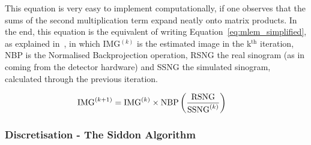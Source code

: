 This equation is very easy to implement computationally, if one observes
that the sums of the second multiplication term expand neatly onto
matrix products. In the end, this equation is the equivalent of writing
Equation~\ref{eq:mlem_simplified}, as explained in~\cite{Bruyant2002a},
in which IMG$^{(k)}$ is the estimated image in the k$^{\text{th}}$
iteration, NBP is the Normalised Backprojection operation, RSNG the real
sinogram (as in coming from the detector hardware) and SSNG the
simulated sinogram, calculated through the previous iteration.

\begin{equation}
    \centering
    \begin{split}
        \text{IMG}^{(k+1)} = \text{IMG}^{(k)}&
        \times\text{NBP} \left(\frac{\text{RSNG}}{\text{SSNG}^{(k)}}\right)
    \end{split}
    \label{eq:mlem_simplified}
\end{equation}


\subsubsection{Discretisation - The Siddon Algorithm}%
\label{ssub:theobg_tomography_iterativemethods_siddon}



